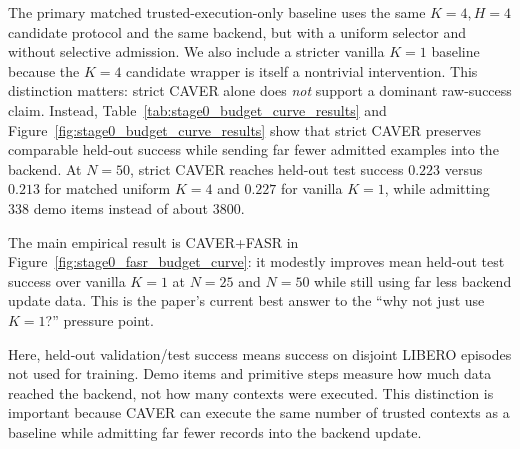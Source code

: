 \documentclass[10pt]{article}
\theoremstyle{plain}
\theoremstyle{definition}
\theoremstyle{remark}
\begin{document}
The primary matched trusted-execution-only baseline uses the same $K=4,H=4$ candidate protocol and the same backend, but with a uniform selector and without selective admission. We also include a stricter vanilla $K=1$ baseline because the $K=4$ candidate wrapper is itself a nontrivial intervention. This distinction matters: strict CAVER alone does \emph{not} support a dominant raw-success claim. Instead, Table~\ref{tab:stage0_budget_curve_results} and Figure~\ref{fig:stage0_budget_curve_results} show that strict CAVER preserves comparable held-out success while sending far fewer admitted examples into the backend. At $N=50$, strict CAVER reaches held-out test success $0.223$ versus $0.213$ for matched uniform $K=4$ and $0.227$ for vanilla $K=1$, while admitting $338$ demo items instead of about $3800$.

The main empirical result is CAVER+FASR in Figure~\ref{fig:stage0_fasr_budget_curve}: it modestly improves mean held-out test success over vanilla $K=1$ at $N=25$ and $N=50$ while still using far less backend update data. This is the paper's current best answer to the ``why not just use $K=1$?'' pressure point.

Here, held-out validation/test success means success on disjoint LIBERO episodes not used for training. Demo items and primitive steps measure how much data reached the backend, not how many contexts were executed. This distinction is important because CAVER can execute the same number of trusted contexts as a baseline while admitting far fewer records into the backend update.

\begin{center}
\end{center}
\end{document}
